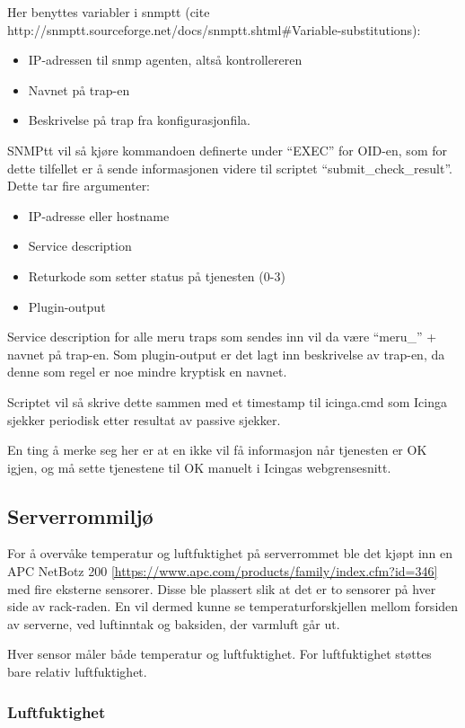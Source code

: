 Her benyttes variabler i snmptt (cite http://snmptt.sourceforge.net/docs/snmptt.shtml\#Variable-substitutions):
\begin{itemize}
	\item IP-adressen til snmp agenten, altså kontrollereren
	\item Navnet på trap-en
	\item Beskrivelse på trap fra konfigurasjonfila.
\end{itemize}

SNMPtt vil så kjøre kommandoen definerte under “EXEC” for OID-en, som for dette tilfellet er å sende informasjonen videre til scriptet “submit\_check\_result”. Dette tar fire argumenter:

\begin{itemize}
	\item IP-adresse eller hostname 
	\item Service description
	\item Returkode som setter status på tjenesten (0-3)
	\item Plugin-output
\end{itemize}

Service description for alle meru traps som sendes inn vil da være “meru\_” + navnet på trap-en. Som plugin-output er det lagt inn beskrivelse av trap-en, da denne som regel er noe mindre kryptisk en navnet.

Scriptet vil så skrive dette sammen med et timestamp til icinga.cmd som Icinga sjekker periodisk etter resultat av passive sjekker.

En ting å merke seg her er at en ikke vil få informasjon når tjenesten er OK igjen, og må sette tjenestene til OK manuelt i Icingas webgrensesnitt.

\subsection{Serverrommiljø}

For å overvåke temperatur og luftfuktighet på serverrommet ble det kjøpt inn en APC NetBotz 200 \ref{https://www.apc.com/products/family/index.cfm?id=346} med fire eksterne sensorer. Disse ble plassert slik at det er to sensorer på hver side av rack-raden. En vil dermed kunne se temperaturforskjellen mellom forsiden av serverne, ved luftinntak og baksiden, der varmluft går ut.

Hver sensor måler både temperatur og luftfuktighet. For luftfuktighet støttes bare relativ luftfuktighet.

\subsubsection{Luftfuktighet}

